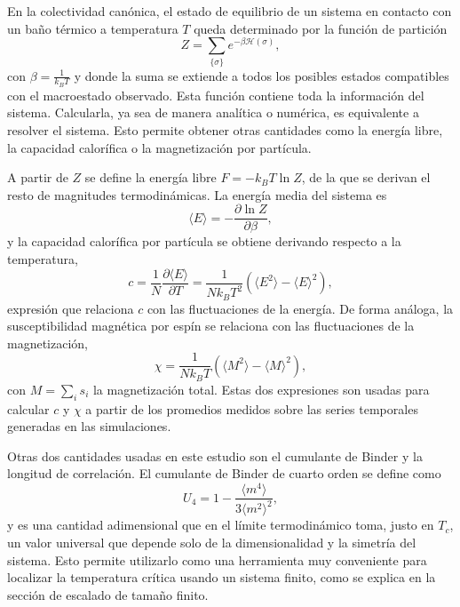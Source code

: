 En la colectividad canónica, el estado de equilibrio de un sistema en contacto con un baño térmico a temperatura $T$ queda determinado por la función de partición
\[
Z = \sum_{\{\sigma\}} e^{-\beta \mathcal{H}(\sigma)},
\]
con $\beta = \frac{1}{k_B T}$ y donde la suma se extiende a todos los posibles estados compatibles con el macroestado observado. Esta función contiene toda la información del sistema. Calcularla, ya sea de manera analítica o numérica, es equivalente a resolver el sistema. Esto permite obtener otras cantidades como la energía libre, la capacidad calorífica o la magnetización por partícula.

A partir de $Z$ se define la energía libre $F = -k_B T \ln Z$, de la que se derivan el resto de magnitudes termodinámicas. La energía media del sistema es
\[
\langle E \rangle = -\frac{\partial \ln Z}{\partial \beta},
\]
y la capacidad calorífica por partícula se obtiene derivando respecto a la temperatura,
\begin{equation} \label{eq:Cv}
    c = \frac{1}{N}\frac{\partial \langle E \rangle}{\partial T} = \frac{1}{N k_B T^2}\left(\langle E^2 \rangle - \langle E \rangle^2\right),
\end{equation}
expresión que relaciona $c$ con las fluctuaciones de la energía. De forma análoga, la susceptibilidad magnética por espín se relaciona con las fluctuaciones de la magnetización,
\[
\chi = \frac{1}{N k_B T}\left(\langle M^2 \rangle - \langle M \rangle^2\right),
\]
con $M = \sum_i s_i$ la magnetización total. Estas dos expresiones son usadas para calcular $c$ y $\chi$ a partir de los promedios medidos sobre las series temporales generadas en las simulaciones.

Otras dos cantidades usadas en este estudio son el cumulante de Binder y la longitud de correlación. El cumulante de Binder de cuarto orden se define como
\[
U_4 = 1 - \frac{\langle m^4 \rangle}{3\langle m^2 \rangle^2},
\]
y es una cantidad adimensional que en el límite termodinámico toma, justo en $T_c$, un valor universal que depende solo de la dimensionalidad y la simetría del sistema. Esto permite utilizarlo como una herramienta muy conveniente para localizar la temperatura crítica usando un sistema finito, como se explica en la sección de escalado de tamaño finito.

